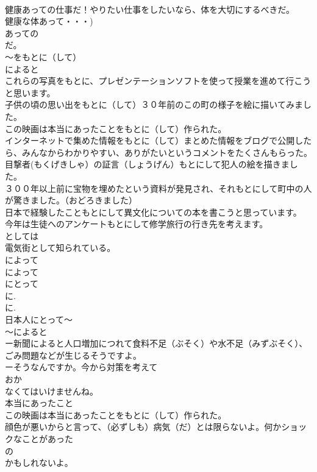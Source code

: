 \documentclass[8pt]{extreport}
\begin{document}
\begin{CJK}{UTF8}{min}
\\	健康あっての仕事だ！やりたい仕事をしたいなら、体を大切にするべきだ。
\\	健康な体あって・・・) 
\\	あっての
\\	だ。　
\\	～をもとに（して）
\\	によると 
\\	これらの写真をもとに、プレゼンテーションソフトを使って授業を進めて行こうと思います。
\\	子供の頃の思い出をもとに（して）３０年前のこの町の様子を絵に描いてみました。
\\	この映画は本当にあったことをもとに（して）作られた。
\\	インターネットで集めた情報をもとに（して）まとめた情報をブログで公開したら、みんなからわかりやすい、ありがたいというコメントをたくさんもらった。
\\	目撃者(もくげきしゃ）の証言（しょうげん）もとにして犯人の絵を描きました。
\\	３００年以上前に宝物を埋めたという資料が発見され、それもとにして町中の人が驚きました。（おどろきました）
\\	日本で経験したこともとにして異文化についての本を書こうと思っています。
\\	今年は生徒へのアンケートもとにして修学旅行の行き先を考えます。
\\	としては
\\	電気街として知られている。　
\\	によって
\\	によって
\\	にとって
\\	に. 
\\	に.
\\	日本人にとって～　　
\\	～によると
\\	ー新聞によると人口増加につれて食料不足（ぶそく）や水不足（みずぶそく）、ごみ問題などが生じるそうですよ。
\\	ーそうなんですか。今から対策を考えて
\\	おか
\\	なくてはいけませんね。	
\\	本当にあったこと
\\	この映画は本当にあったことをもとに（して）作られた。
\\	顔色が悪いからと言って、（必ずしも）病気（だ）とは限らないよ。何かショックなことがあった
\\	の
\\	かもしれないよ。

\end{CJK}
\end{document}
